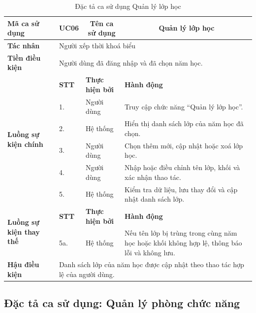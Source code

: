 \documentclass[../DoAn.tex]{subfiles}
\begin{document}
\begin{longtable}{|p{2.8cm}|p{1cm}|p{2.8cm}|p{6.3cm}|}
\caption{Đặc tả ca sử dụng Quản lý lớp học}
\label{tab:app_uc_quan_ly_lop_hoc} \\
\hline
\multicolumn{1}{|l|}{\textbf{Mã ca sử dụng}} & \multicolumn{1}{c|}{UC06} &
\multicolumn{1}{c|}{\textbf{Tên ca sử dụng}} & \multicolumn{1}{c|}{Quản lý lớp học} \\
\hline
\multicolumn{1}{|l|}{\textbf{Tác nhân}} & \multicolumn{3}{l|}{Người xếp thời khoá biểu} \\
\hline
\multicolumn{1}{|l|}{\textbf{Tiền điều kiện}} & \multicolumn{3}{l|}{Người dùng đã đăng nhập và đã chọn năm học.} \\
\hline
\multirow{6}{2.8cm}{\textbf{Luồng sự kiện chính}} & \textbf{STT} & \textbf{Thực hiện bởi} & \textbf{Hành động} \\
\cline{2-4}
& 1. & Người dùng & Truy cập chức năng ``Quản lý lớp học''. \\
\cline{2-4}
& 2. & Hệ thống & Hiển thị danh sách lớp của năm học đã chọn. \\
\cline{2-4}
& 3. & Người dùng & Chọn thêm mới, cập nhật hoặc xoá lớp học. \\
\cline{2-4}
& 4. & Người dùng & Nhập hoặc điều chỉnh tên lớp, khối và xác nhận thao tác. \\
\cline{2-4}
& 5. & Hệ thống & Kiểm tra dữ liệu, lưu thay đổi và cập nhật danh sách lớp. \\
\hline
\multirow{2}{2.8cm}{\textbf{Luồng sự kiện thay thế}} & \textbf{STT} & \textbf{Thực hiện bởi} & \textbf{Hành động} \\
\cline{2-4}
& 5a. & Hệ thống & Nếu tên lớp bị trùng trong cùng năm học hoặc khối không hợp lệ, thông báo lỗi và không lưu. \\
\hline
\multicolumn{1}{|l|}{\textbf{Hậu điều kiện}} & \multicolumn{3}{p{10.5cm}|}{Danh sách lớp của năm học được cập nhật theo thao tác hợp lệ của người dùng.} \\
\hline
\end{longtable}

\subsection{Đặc tả ca sử dụng: Quản lý phòng chức năng}
\end{document}
